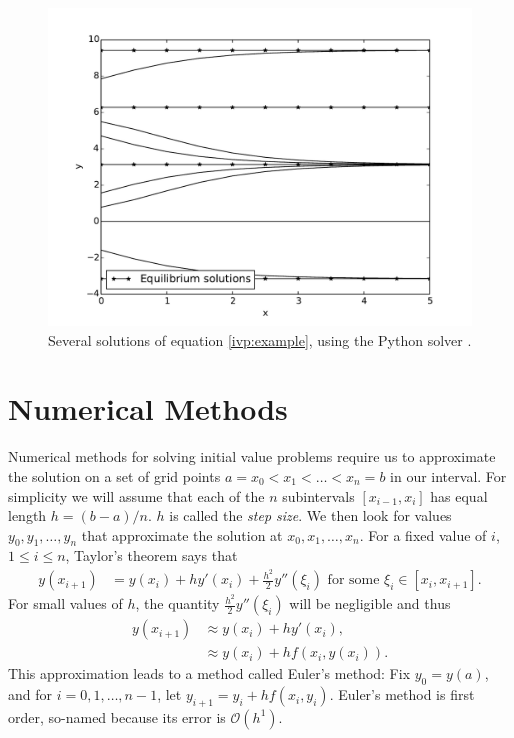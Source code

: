 \begin{figure}
\centering
\includegraphics[width=\textwidth]{Fig2.pdf}
\caption{Several solutions of equation \eqref{ivp:example}, using the Python solver . }
\label{ivp:int_curves}
\end{figure}


\section*{Numerical Methods}
Numerical methods for solving initial value problems require us to approximate the solution on a set of grid points $a = x_0< x_1<\hdots< x_n = b$ in our interval.  
For simplicity we will assume that each of the $n$ subintervals $[x_{i-1},x_i]$ has equal length $h = (b-a)/n$. $h$ is called the \textit{step size}. 
We then look for values $y_0, y_1, \hdots, y_n$ that approximate the solution at $x_0, x_1, \hdots, x_n$.
For a fixed value of $i$, $ 1 \leq i \leq n$, Taylor's theorem says that
\begin{align*}
y(x_{i+1}) &= y(x_{i}) + h y'(x_i) + \frac{h^2}{2} y''(\xi_i)\text{ for some }\xi_i \in [x_i,x_{i+1}].
\end{align*}
For small values of $h$, the quantity $\frac{h^2}{2} y''(\xi_i)$ will be negligible and thus
\begin{align*}
y(x_{i+1}) &\approx y(x_{i}) + h y'(x_i)  ,\\
&\approx y(x_{i}) + h f(x_i,y(x_i)).
\end{align*}
This approximation leads to a method called Euler's method: Fix $y_0 = y(a)$, and for $i = 0, 1, \hdots, n-1$, let $y_{i+1} = y_i +hf(x_i,y_i)$. 
Euler's method is first order, so-named because its error is $\mathcal{O}(h^1)$.

